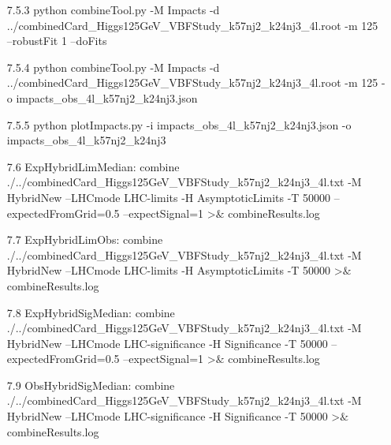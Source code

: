 \documentclass[]{report}
\begin{document}
\begin{itemize}
\item[7.5.3] python combineTool.py -M Impacts -d ../combinedCard\_Higgs125GeV\_VBFStudy\_k57nj2\_k24nj3\_4l.root -m 125 --robustFit 1 --doFits
\item[7.5.4] python combineTool.py -M Impacts -d ../combinedCard\_Higgs125GeV\_VBFStudy\_k57nj2\_k24nj3\_4l.root -m 125 -o impacts\_obs\_4l\_k57nj2\_k24nj3.json
\item[7.5.5] python plotImpacts.py -i impacts\_obs\_4l\_k57nj2\_k24nj3.json -o impacts\_obs\_4l\_k57nj2\_k24nj3
\item[7.6] ExpHybridLimMedian: combine ./../combinedCard\_Higgs125GeV\_VBFStudy\_k57nj2\_k24nj3\_4l.txt -M HybridNew --LHCmode LHC-limits -H AsymptoticLimits -T 50000 --expectedFromGrid=0.5 --expectSignal=1 >$\&$ combineResults.log
\item[7.7] ExpHybridLimObs: combine ./../combinedCard\_Higgs125GeV\_VBFStudy\_k57nj2\_k24nj3\_4l.txt -M HybridNew --LHCmode LHC-limits -H AsymptoticLimits -T 50000 >$\&$ combineResults.log
\item[7.8] ExpHybridSigMedian: combine ./../combinedCard\_Higgs125GeV\_VBFStudy\_k57nj2\_k24nj3\_4l.txt -M HybridNew --LHCmode LHC-significance -H Significance -T 50000 --expectedFromGrid=0.5 --expectSignal=1 >$\&$ combineResults.log
\item[7.9] ObsHybridSigMedian: combine ./../combinedCard\_Higgs125GeV\_VBFStudy\_k57nj2\_k24nj3\_4l.txt -M HybridNew --LHCmode LHC-significance -H Significance -T 50000 >$\&$ combineResults.log	
\end{itemize}


\appendix
\end{document}

